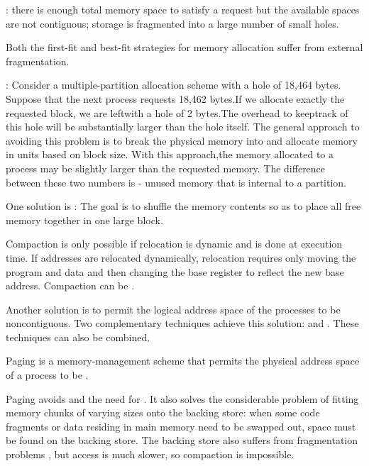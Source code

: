       \par {}: there is enough total memory space to satisfy a request but the available spaces are not contiguous; storage is fragmented into a large number of small holes.
      \par Both the first-fit and best-fit strategies for memory allocation suffer from external fragmentation.

      \par {}: Consider a multiple-partition allocation scheme with a hole of 18,464 bytes. Suppose that the next process requests 18,462 bytes.If we allocate exactly the requested block,
we are leftwith a hole of 2 bytes.The overhead to keeptrack of this hole will be substantially larger than the hole itself. The general approach to avoiding this problem is to break the physical memory into  and allocate memory in units based on block size. With this approach,the memory allocated to a process may be slightly larger than the requested memory. The difference between these two numbers is  - unused memory that is internal to a partition.

      \par One solution is : The goal is to shuffle the memory contents so as to place all free memory together in one large block.
      \par Compaction is only possible if relocation is dynamic and is done at execution time. If addresses are relocated dynamically, relocation requires only moving the program and data and then changing the base register to reflect the new base address. Compaction can be .
      \par Another solution is to permit the logical address space of the processes to be noncontiguous. Two complementary techniques achieve this solution:  and . These techniques can also be combined.


  \par Paging is a memory-management scheme that permits the physical address space of a process to be .
  \par Paging avoids  and the need for . It also solves the considerable problem of fitting memory chunks of varying sizes onto the backing store: when some code fragments or data residing in main memory need to be swapped out, space must be found on the backing store. The backing store also suffers from fragmentation problems , but access is much slower, so compaction is impossible.
  

